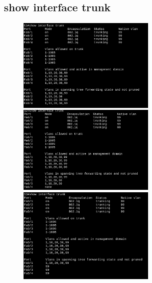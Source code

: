 \documentclass[letterpaper,12pt]{article}
\begin{document}
\begin{sloppypar}
\subsection{show interface trunk}
\begin{figure}[H]
    \centering
    \includegraphics[width=0.6\textwidth]{trunk1.png}
    \vspace{0.3cm}\\ 
    \includegraphics[width=0.6\textwidth]{trunk2.png}
    \vspace{0.3cm}\\ 
    \includegraphics[width=0.6\textwidth]{trunk3.png}
\end{figure}

\end{sloppypar}
\end{document}
